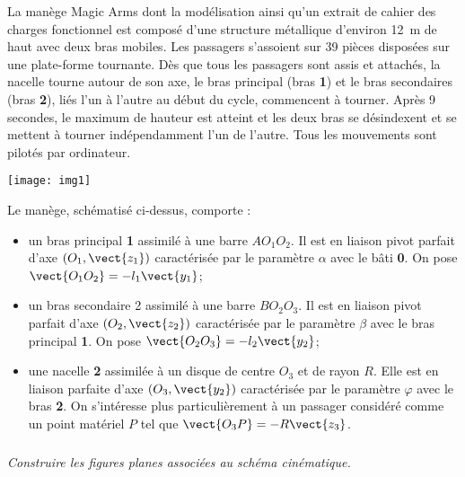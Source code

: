 \ifprof
\else
\begin{multicols}{2}
\fi


La manège Magic Arms dont la modélisation ainsi qu'un extrait de cahier des charges fonctionnel est composé d'une structure métallique d'environ \SI{12}{m} de haut avec deux bras mobiles. Les passagers s'assoient sur 39 pièces disposées sur une plate-forme tournante. Dès que tous les passagers sont assis et attachés, la nacelle tourne autour de son axe, le bras principal (bras \textbf{1}) et le bras secondaires (bras \textbf{2}), liés l'un à l'autre au début du cycle, commencent à tourner. Après 9 secondes, le maximum de hauteur est atteint et les deux bras se désindexent et se mettent à tourner indépendamment l'un de l'autre. Tous les mouvements sont pilotés par ordinateur. 

\begin{center}
\texttt{[image: img1]}
\end{center}

Le manège, schématisé ci-dessus, comporte :
\begin{itemize}
\item un bras principal \textbf{1} assimilé à une barre $AO_1O_2$. Il est en liaison pivot parfait d'axe $(O_1,\vect{z_1})$ caractérisée par le paramètre $\alpha$ avec le bâti \textbf{0}. On pose $\vect{O_1O_2}=-l_1\vect{y_1}$;
\item un bras secondaire 2 assimilé à une barre $BO_2O_3$. Il est en liaison pivot parfait d'axe $(O_2,\vect{z_2})$ caractérisée par le paramètre $\beta$ avec le bras principal \textbf{1}. On pose $\vect{O_2O_3}=-l_2\vect{y_2}$;
\item une nacelle \textbf{2} assimilée à un disque de centre $O_3$ et de rayon $R$. Elle est en liaison parfaite d'axe $(O_3,\vect{y_2})$ caractérisée par le paramètre $\varphi$ avec le bras \textbf{2}. On s'intéresse plus particulièrement à un passager considéré comme un point matériel $P$ tel que $\vect{O_3P}=-R\vect{z_3}$.
\end{itemize}
\subparagraph{}
\textit{Construire les figures planes associées au schéma cinématique.}
\ifprof

\begin{corrige}


\end{corrige}
\end{multicols}
